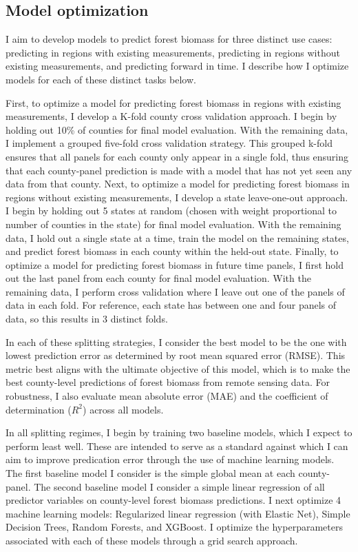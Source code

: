 \documentclass{article}
\begin{document}
\subsection{Model optimization}
I aim to develop models to predict forest biomass for three distinct use cases: predicting in regions with existing measurements, predicting in regions without existing measurements, and predicting forward in time. I describe how I optimize models for each of these distinct tasks below.

First, to optimize a model for predicting forest biomass in regions with existing measurements, I develop a K-fold county cross validation approach. I begin by holding out 10\% of counties for final model evaluation. With the remaining data, I implement a grouped five-fold cross validation strategy. This grouped k-fold ensures that all panels for each county only appear in a single fold, thus ensuring that each county-panel prediction is made with a model that has not yet seen any data from that county. Next, to optimize a model for predicting forest biomass in regions without existing measurements, I develop a state leave-one-out approach. I begin by holding out 5 states at random (chosen with weight proportional to number of counties in the state) for final model evaluation. With the remaining data, I hold out a single state at a time, train the model on the remaining states, and predict forest biomass in each county within the held-out state. Finally, to optimize a model for predicting forest biomass in future time panels, I first hold out the last panel from each county for final model evaluation. With the remaining data, I perform cross validation where I leave out one of the panels of data in each fold. For reference, each state has between one and four panels of data, so this results in 3 distinct folds. 

In each of these splitting strategies, I consider the best model to be the one with lowest prediction error as determined by root mean squared error (RMSE). This metric best aligns with the ultimate objective of this model, which is to make the best county-level predictions of forest biomass from remote sensing data. For robustness, I also evaluate mean absolute error (MAE) and the coefficient of determination ($R^2$) across all models.

In all splitting regimes, I begin by training two baseline models, which I expect to perform least well. These are intended to serve as a standard against which I can aim to improve predication error through the use of machine learning models. The first baseline model I consider is the simple global mean at each county-panel. The second baseline model I consider a simple linear regression of all predictor variables on county-level forest biomass predictions. I next optimize 4 machine learning models: Regularized linear regression (with Elastic Net), Simple Decision Trees, Random Forests, and XGBoost. I optimize the hyperparameters associated with each of these models through a grid search approach.
\end{document}
